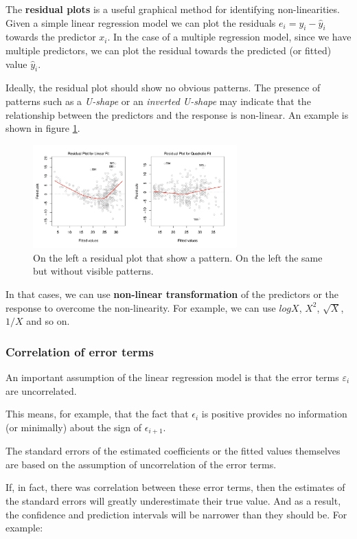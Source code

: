 The \textbf{residual plots} is a useful graphical method for identifying non-linearities.
Given a simple linear regression model we can plot the residuals $e_i=y_i-\hat y_i$ towards the predictor $x_i$.
In the case of a multiple regression model, since we have multiple predictors, we can plot the residual towards the predicted (or fitted) value $\hat y_i$.

Ideally, the residual plot should show no obvious patterns. 
The presence of patterns such as a \textit{U-shape} or an \textit{inverted U-shape} may indicate that the relationship between the predictors and the response is non-linear.
An example is shown in figure \ref{fig:residuals_example}.
\begin{figure}
    \centering
    \includegraphics[width=0.7\textwidth]{./figures/chapter_3/residuals_example.png}
    \caption{On the left a residual plot that show a pattern. On the left the same but without visible patterns.}
    \label{fig:residuals_example}
\end{figure}

In that cases, we can use \textbf{non-linear transformation} of the predictors or the response to overcome the non-linearity. For example, we can use $log X$, $X^2$, $\sqrt{X}$, $1/X$ and so on.
\subsubsection*{Correlation of error terms}
An important assumption of the linear regression model is that the error terms $\varepsilon_i$ are uncorrelated.

This means, for example, that the fact that $\epsilon_i$ is positive provides no information (or minimally) about the sign of $\epsilon_{i+1}$.

The standard errors of the estimated coefficients or the fitted values themselves are based on the assumption of uncorrelation of the error terms.

If, in fact, there was correlation between these error terms, then the estimates of the standard errors will greatly underestimate their true value. And as a result, the confidence and prediction intervals will be narrower than they should be. For example:

